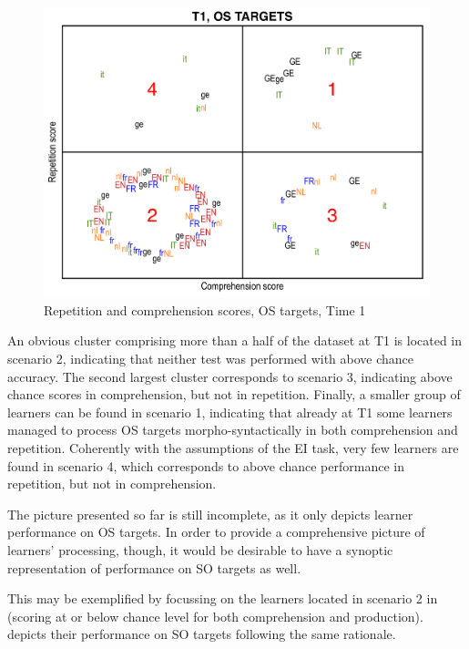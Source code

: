 \begin{figure}
    \includegraphics[width=\textwidth]{figures/06-2.pdf}
    \caption{Repetition and comprehension scores, OS targets, Time 1}
    \label{fig:06:2}
\end{figure}

An obvious cluster comprising more than a half of the dataset at T1 is located in scenario 2, indicating that neither test was performed with above chance accuracy. The second largest cluster corresponds to scenario 3, indicating above chance scores in comprehension, but not in repetition. Finally, a smaller group of learners can be found in scenario 1, indicating that already at T1 some learners managed to process OS targets morpho-syntactically in both comprehension and repetition. Coherently with the assumptions of the EI task, very few learners are found in scenario 4, which corresponds to above chance performance in repetition, but not in comprehension.

The picture presented so far is still incomplete, as it only depicts learner performance on OS targets. In order to provide a comprehensive picture of learners' processing, though, it would be desirable to have a synoptic representation of performance on SO targets as well. 

This may be exemplified by focussing on the learners located in scenario 2 in  (scoring at or below chance level for both comprehension and production).  depicts their performance on SO targets following the same rationale. 

